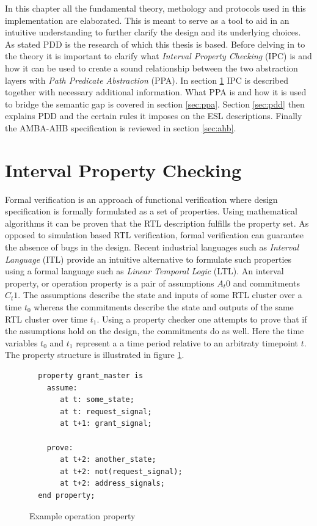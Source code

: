 \label{ch:theory}
In this chapter all the fundamental theory, methology and protocols used in this implementation are elaborated. This is meant to serve as a tool to aid in an intuitive understanding to further clarify the design and its underlying choices. As stated PDD is the research of which this thesis is based. Before delving in to the theory it is important to clarify what \textit{Interval Property Checking} (IPC) is and how it can be used to create a sound relationship between the two abstraction layers with \textit{Path Predicate Abstraction} (PPA). In section \ref{sec:ipc} IPC is described together with necessary additional information. What PPA is and how it is used to bridge the semantic gap is covered in section \ref{sec:ppa}. Section \ref{sec:pdd} then explains PDD and the certain rules it imposes on the ESL descriptions. Finally the AMBA-AHB specification is reviewed in section \ref{sec:ahb}.       


\section{Interval Property Checking}
\label{sec:ipc}
Formal verification is an approach of functional verification where design specification is formally formulated as a set of properties. Using mathematical algorithms it can be proven that the RTL description fulfills the property set. As opposed to simulation based RTL verification, formal verification can guarantee the absence of bugs in the design. Recent industrial languages such as \textit{Interval Language} (ITL) provide an intuitive alternative to formulate such properties using a formal language such as \textit{Linear Temporal Logic} (LTL). An interval property, or operation property is a pair of assumptions $A_t0$ and commitments $C_t1$. The assumptions describe the state and inputs of some RTL cluster over a time $t_0$ whereas the commitments describe the state and outputs of the same RTL cluster over time $t_1$. Using a property checker one attempts to prove that if the assumptions hold on the design, the commitments do as well. Here the time variables $t_0$ and $t_1$ represent a a time period relative to an arbitraty timepoint $t$. The property structure is illustrated in figure \ref{fig:exop}.  

\begin{figure}[hbt]
\begin{lstlisting}
  property grant_master is
    assume:
       at t: some_state;
       at t: request_signal;
       at t+1: grant_signal;

    prove:
       at t+2: another_state;
       at t+2: not(request_signal);
       at t+2: address_signals;
  end property; 
\end{lstlisting}
\label{fig:exop}
\caption{Example operation property}
\end{figure}

